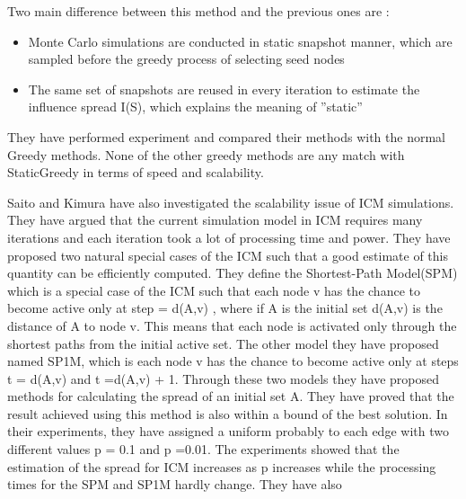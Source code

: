 \documentclass[english]{tktltiki}
\begin{document}
Two main difference between this method and the previous ones are :
\begin{itemize}
\item
Monte Carlo simulations are conducted in static snapshot manner, which are sampled before the greedy process of selecting seed nodes
\item
The same set of snapshots are reused in every iteration to estimate the influence spread I(S), which explains the meaning of ''static''
\end{itemize}

They have performed experiment and compared their methods with the normal Greedy methods. None of the other greedy methods are any match with StaticGreedy in terms of speed and scalability. 

Saito and Kimura \cite{kimura06} have also investigated the scalability issue of ICM simulations. They have argued that the current simulation model in ICM requires many iterations and each iteration took a lot of processing time and power. They have proposed two natural special cases of the ICM such that a good estimate of this quantity can be efficiently computed. They define the Shortest-Path Model(SPM) which is a special case of the ICM such that each node v has the chance to become active only at step = d(A,v) , where if A is the initial set d(A,v) is the distance of A to node v. This means that each node is activated only through the shortest paths from the initial active set. The other model they have proposed named SP1M, which is each node v has the chance to become active only at steps t = d(A,v) and t =d(A,v) + 1. Through these two models they have proposed methods for calculating the spread of an initial set A. They have proved that the result achieved using this method is also within a bound of the best solution. In their experiments, they have assigned a uniform probably to each edge with two different values p = 0.1 and p =0.01. The experiments showed that the estimation of the spread for ICM increases as p increases while the processing times for the SPM and SP1M hardly change. They have also \\
\end{document}
